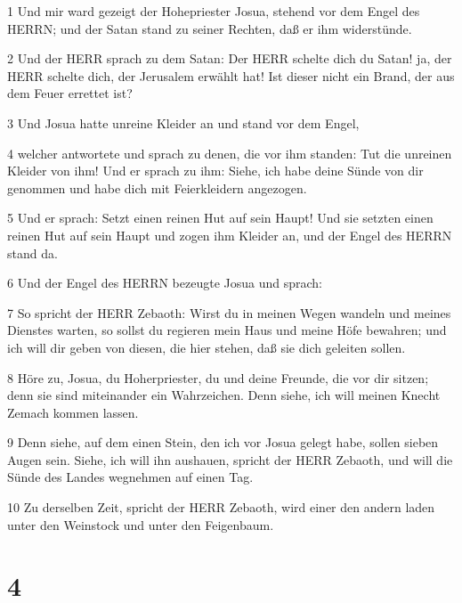 \par 1 Und mir ward gezeigt der Hohepriester Josua, stehend vor dem Engel des HERRN; und der Satan stand zu seiner Rechten, daß er ihm widerstünde.
\par 2 Und der HERR sprach zu dem Satan: Der HERR schelte dich du Satan! ja, der HERR schelte dich, der Jerusalem erwählt hat! Ist dieser nicht ein Brand, der aus dem Feuer errettet ist?
\par 3 Und Josua hatte unreine Kleider an und stand vor dem Engel,
\par 4 welcher antwortete und sprach zu denen, die vor ihm standen: Tut die unreinen Kleider von ihm! Und er sprach zu ihm: Siehe, ich habe deine Sünde von dir genommen und habe dich mit Feierkleidern angezogen.
\par 5 Und er sprach: Setzt einen reinen Hut auf sein Haupt! Und sie setzten einen reinen Hut auf sein Haupt und zogen ihm Kleider an, und der Engel des HERRN stand da.
\par 6 Und der Engel des HERRN bezeugte Josua und sprach:
\par 7 So spricht der HERR Zebaoth: Wirst du in meinen Wegen wandeln und meines Dienstes warten, so sollst du regieren mein Haus und meine Höfe bewahren; und ich will dir geben von diesen, die hier stehen, daß sie dich geleiten sollen.
\par 8 Höre zu, Josua, du Hoherpriester, du und deine Freunde, die vor dir sitzen; denn sie sind miteinander ein Wahrzeichen. Denn siehe, ich will meinen Knecht Zemach kommen lassen.
\par 9 Denn siehe, auf dem einen Stein, den ich vor Josua gelegt habe, sollen sieben Augen sein. Siehe, ich will ihn aushauen, spricht der HERR Zebaoth, und will die Sünde des Landes wegnehmen auf einen Tag.
\par 10 Zu derselben Zeit, spricht der HERR Zebaoth, wird einer den andern laden unter den Weinstock und unter den Feigenbaum.

\chapter{4}

